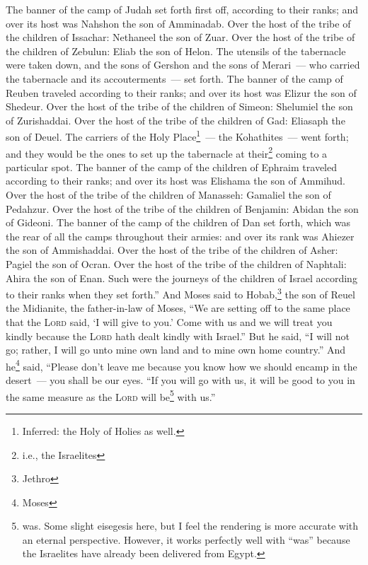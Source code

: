 \begin{enumerate*}[mode=unboxed]
     The banner of the camp of Judah set forth first off, according to their ranks; and over its host was Nahshon the son of Amminadab.%
     Over the host of the tribe of the children of Issachar: Nethaneel the son of Zuar.%
     Over the host of the tribe of the children of Zebulun: Eliab the son of Helon.%
     The utensils of the tabernacle were taken down, and the sons of Gershon and the sons of Merari~--- who carried the tabernacle and its accouterments~--- set forth.%
     The banner of the camp of Reuben traveled according to their ranks; and over its host was Elizur the son of Shedeur.%
     Over the host of the tribe of the children of Simeon: Shelumiel the son of Zurishaddai.%
     Over the host of the tribe of the children of Gad: Eliasaph the son of Deuel.%
     The carriers of the Holy Place\footnote{Inferred: the Holy of Holies as well.}~--- the Kohathites~--- went forth; and they would be the ones to set up the tabernacle at their\footnote{i.e., the Israelites} coming to a particular spot.%
     The banner of the camp of the children of Ephraim traveled according to their ranks; and over its host was Elishama the son of Ammihud.%
     Over the host of the tribe of the children of Manasseh: Gamaliel the son of Pedahzur.%
     Over the host of the tribe of the children of Benjamin: Abidan the son of Gideoni.%
     The banner of the camp of the children of Dan set forth, which was the rear of all the camps throughout their armies: and over its rank was Ahiezer the son of Ammishaddai.%
     Over the host of the tribe of the children of Asher: Pagiel the son of Ocran.%
     Over the host of the tribe of the children of Naphtali: Ahira the son of Enan.%
     Such were the journeys of the children of Israel according to their ranks when they set forth.''%
     And Moses said to Hobab,\footnote{Jethro} the son of Reuel the Midianite, the father-in-law of Moses, ``We are setting off to the same place that the \textsc{Lord} said, `I will give to you.' Come with us and we will treat you kindly because the \textsc{Lord} hath dealt kindly with Israel.''%
     But he said, ``I will not go; rather, I will go unto mine own land and to mine own home country.''%
     And he\footnote{Moses} said, ``Please don't leave me because you know how we should encamp in the desert~--- you shall be our eyes.%
     ``If you will go with us, it will be good to you in the same measure as the \textsc{Lord} will be\footnote{was. Some slight eisegesis here, but I feel the rendering is more accurate with an eternal perspective. However, it works perfectly well with ``was'' because the Israelites have already been delivered from Egypt.} with us.''%

\end{enumerate*}
